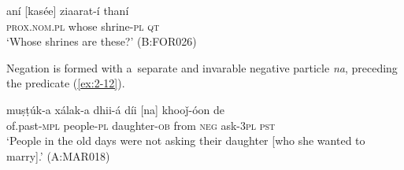 \begin{exe}
\ex
\label{ex:2-11}
\gll aní [kasée] ziaarat-í thaní \\
	\textsc{prox.nom.pl} whose shrine-\textsc{pl} \textsc{qt} \\
\glt `Whose shrines are these?' (B:FOR026)
\end{exe}

Negation is formed with a~separate and invarable negative particle \textit{na}, preceding the predicate (\ref{ex:2-12}).

\begin{exe}
\ex
\label{ex:2-12}
\gll muṣṭúk-a xálak-a dhii-á díi [na] khooǰ-óon de \\
	of.past-\textsc{mpl} people-\textsc{pl} daughter-\textsc{ob} from \textsc{neg} ask-\textsc{3pl} \textsc{pst} \\
\glt `People in the old days were not asking their daughter [who she wanted to marry].' (A:MAR018)
\end{exe}